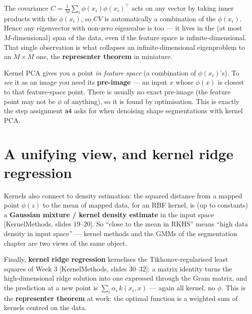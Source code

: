 \documentclass[11pt]{article}
\newcommand{\deck}[1]{\textsf{\small[#1]}}
\begin{document}
\begin{notebox}
The covariance $C=\frac1M\sum_i\phi(x_i)\phi(x_i)^{\!\top}$ acts on any vector by
taking inner products with the $\phi(x_i)$, so $CV$ is automatically a combination
of the $\phi(x_i)$. Hence any eigenvector with non-zero eigenvalue is too --- it
lives in the (at most $M$-dimensional) span of the data, even if the feature space
is infinite-dimensional. That single observation is what collapses an
infinite-dimensional eigenproblem to an $M\times M$ one, the \textbf{representer
theorem} in miniature.
\end{notebox}

\begin{notebox}
Kernel PCA gives you a point \emph{in feature space} (a combination of
$\phi(x_i)$'s). To \emph{see} it as an image you need its \textbf{pre-image} ---
an input $x$ whose $\phi(x)$ is closest to that feature-space point. There is
usually no exact pre-image (the feature point may not be $\phi$ of anything), so
it is found by optimisation. This is exactly the step assignment \texttt{a4} asks
for when denoising shape segmentations with kernel PCA.
\end{notebox}

\section{A unifying view, and kernel ridge regression}

Kernels also connect to density estimation: the squared distance from a mapped
point $\phi(z)$ to the mean of mapped data, for an RBF kernel, is (up to
constants) a \textbf{Gaussian mixture / kernel density estimate} in the input
space \deck{KernelMethods, slides 19--20}. So ``close to the mean in RKHS'' means
``high data density in input space'' --- kernel methods and the GMMs of the
segmentation chapter are two views of the same object.

Finally, \textbf{kernel ridge regression} kernelises the Tikhonov-regularised
least squares of Week 3 \deck{KernelMethods, slides 30--32}: a matrix identity
turns the high-dimensional ridge solution into one expressed through the Gram
matrix, and the prediction at a new point is $\sum_i\alpha_i\,k(x_i,x)$ --- again
all kernel, no $\phi$. This is the \textbf{representer theorem} at work: the
optimal function is a weighted sum of kernels centred on the data.
\end{document}

